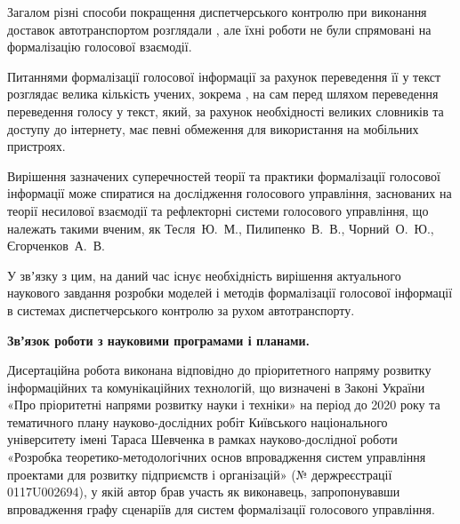 Загалом різні способи покращення диспетчерського контролю при виконання доставок автотранспортом розглядали , але їхні роботи не були спрямовані на формалізацію голосової взаємодії.

Питаннями формалізації голосової інформації за рахунок переведення її у текст розглядає велика кількість учених, зокрема , на сам перед шляхом переведення переведення голосу у текст, який, за рахунок необхідності великих словників та доступу до інтернету, має певні обмеження для використання на мобільних пристроях.

Вирішення зазначених суперечностей теорії та практики формалізації голосової інформації може спиратися на дослідження голосового управління, заснованих на теорії несилової взаємодії та рефлекторні системи голосового управління, що належать такими вченим, як Тесля~Ю.~М., Пилипенко~В.~В., Чорний~О.~Ю., Єгорченков~А.~В.

У звʼязку з цим, на даний час існує необхідність вирішення актуального наукового завдання розробки моделей і методів формалізації голосової інформації в системах диспетчерського контролю за рухом автотранспорту.


\textbf{Звʼязок роботи з науковими програмами і планами.}

Дисертаційна робота виконана відповідно до пріоритетного напряму розвитку інформаційних та комунікаційних технологій, що визначені в Законі України «Про пріоритетні напрями розвитку науки і техніки» на період до 2020 року та тематичного плану науково-дослідних робіт Київського національного університету імені Тараса Шевченка в рамках науково-дослідної роботи «Розробка теоретико-методологічних основ впровадження систем управління проектами для розвитку підприємств і організацій» (№ держреєстрації 0117U002694), у якій автор брав участь як виконавець, запропонувавши впровадження графу сценаріїв для систем формалізації голосового управління.

